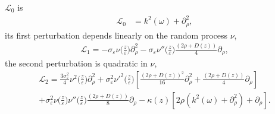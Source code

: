 \documentclass[final]{siamltex}
\begin{document}
$\mathcal{L}_0$ is
\begin{align}
\mathcal{L}_0 &= k^2({\omega}) + \partial_\rho^2,
\end{align}
its first perturbation depends linearly on the random process $\nu$, 
\begin{align}
\mathcal{L}_1 = - \sigma_{\varepsilon}  \nu
  \Big(\frac{z}{\varepsilon}\Big) \partial_\rho^2  - \sigma_{\varepsilon} \nu''
  \Big(\frac{z}{\varepsilon}\Big)\frac{(2\rho + D(z))}{4} \partial_\rho,
\end{align}
the second perturbation is quadratic in $\nu$, 
\begin{align}
\mathcal{L}_2 = \frac{3\sigma_{\varepsilon}^2}{4} \nu^2\Big(\frac{z}{\varepsilon}\Big)
\partial_\rho^2 +
\sigma_{\varepsilon}^2 {\nu'}^2\Big(\frac{z}{\varepsilon}\Big)  \left[  \frac{(2
    \rho + D(z))^2}{16} \partial_\rho^2 + \frac{(2 \rho + D(z))}{4}
  \partial_\rho \right] \nonumber \\ +
\sigma_{\varepsilon}^2\nu\Big(\frac{z}{\varepsilon}\Big)\nu''\Big(\frac{z}{\varepsilon}\Big)
\frac{(2 \rho + D(z))}{8} \partial_\rho- \kappa(z)\left[ 2 \rho
  (k^2({\omega}) + \partial_\rho^2) + \partial_\rho \right] .
\end{align}
\end{document}
